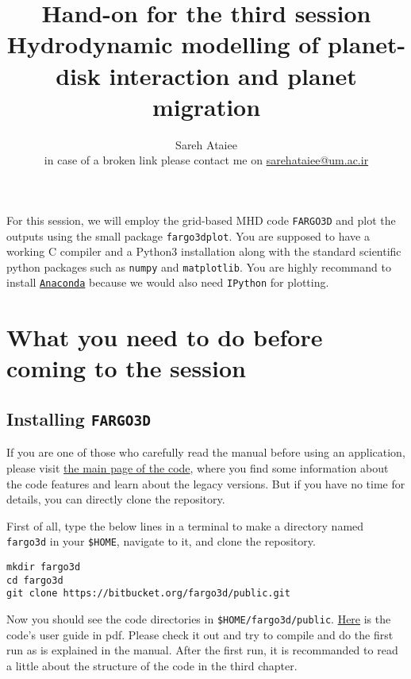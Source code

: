 \documentclass[14pt]{scrartcl}
\title{{\large Hand-on for the third session} \\ Hydrodynamic modelling of planet-disk interaction and planet migration}
\author{{\large Sareh Ataiee} \\ {\normalsize in case of a broken link please contact me on \href{mailto:sarehataiee@um.ac.ir}{sarehataiee@um.ac.ir}} }
\date{}
\begin{document}
\maketitle

For this session, we will employ the grid-based MHD code \texttt{FARGO3D} and plot the outputs using the small package \texttt{fargo3dplot}. You are supposed to have a working C compiler and a Python3 installation along with the standard scientific python packages such as \texttt{numpy} and \texttt{matplotlib}.  You are highly recommand to install \href{https://www.anaconda.com/}{\texttt{Anaconda}} because we would also need  \texttt{IPython} for plotting.

\section{What you need to do before coming to the session} \label{sec:before}
\subsection{Installing \texttt{FARGO3D}} \label{fargo3d}

If you are one of those who carefully read the manual before using an application, please visit \href{http://fargo.in2p3.fr/}{the main page of the code}, where you find some information about the code features and learn about the legacy versions. But if you have no time for details, you can directly clone the repository. 
	
First of all, type the below lines in a terminal to make a directory named \texttt{fargo3d} in your \verb!$HOME!, navigate to it, and clone the repository.	
\begin{verbatim}
mkdir fargo3d
cd fargo3d
git clone https://bitbucket.org/fargo3d/public.git
\end{verbatim}

Now you should see the code directories in \verb!$HOME/fargo3d/public!. \href{http://fargo.in2p3.fr/manuals/FARGO3DUserGuide.pdf}{Here} is the code's user guide in pdf. Please check it out and try to compile and do the first run as is explained in the manual. After the first run, it is recommanded to read a little about the structure of the code in the third chapter. 
\end{document}
